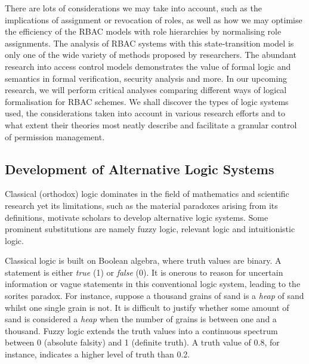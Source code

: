 \documentclass{article}
\begin{document}
There are lots of considerations we may take into account, such as the implications of assignment or revocation of roles, as well as how we may optimise the efficiency of the RBAC models with role hierarchies by normalising role assignments. The analysis of RBAC systems with this state-transition model is only one of the wide variety of methods proposed by researchers. The abundant research into access control models demonstrates the value of formal logic and semantics in formal verification, security analysis and more. In our upcoming research, we will perform critical analyses comparing different ways of logical formalisation for RBAC schemes. We shall discover the types of logic systems used, the considerations taken into account in various research efforts and to what extent their theories most neatly describe and facilitate a granular control of permission management.

\subsection{Development of Alternative Logic Systems}

Classical (orthodox) logic dominates in the field of mathematics and scientific research yet its limitations, such as the material paradoxes arising from its definitions, motivate scholars to develop alternative logic systems. Some prominent substitutions are namely fuzzy logic, relevant logic and intuitionistic logic.\cite{alternative-logic}

Classical logic is built on Boolean algebra, where truth values are binary. A statement is either \textit{true} (1) or \textit{false} (0). It is onerous to reason for uncertain information or vague statements in this conventional logic system, leading to the sorites paradox.\cite{alternative-logic} For instance, suppose a thousand grains of sand is a \textit{heap} of sand whilst one single grain is not. It is difficult to justify whether some amount of sand is considered a \textit{heap} when the number of grains is between one and a thousand. Fuzzy logic extends the truth values into a continuous spectrum between 0 (absolute falsity) and 1 (definite truth). A truth value of 0.8, for instance, indicates a higher level of truth than 0.2.
\end{document}
